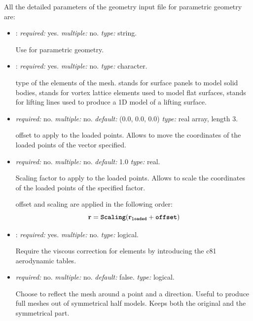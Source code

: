 All the detailed parameters of the geometry input file for parametric geometry are:
\begin{itemize}
  \item {}: \textit{required:} yes. \textit{multiple:} no. \textit{type:} string. 

  Use  for parametric geometry.

  \item {}: \textit{required:} yes. \textit{multiple:} no. \textit{type:} character.

  type of the elements of the mesh.  stands for surface panels to model solid bodies, 
   stands for vortex lattice elements used to model flat surfaces,  
  stands for lifting lines used to produce a 1D model of a lifting surface. 

  \item {} \textit{required:} no. \textit{multiple:} no. 
  \textit{default:} (0.0, 0.0, 0.0) \textit{type:} real array, length 3.

  offset to apply to the loaded points. Allows to move the coordinates of the loaded points of the vector specified. 

  \item {} \textit{required:} no. \textit{multiple:} no. 
  \textit{default:} 1.0 \textit{type:} real.

  Scaling factor to apply to the loaded points. Allows to scale the coordinates of the loaded points of the specified factor.

  offset and scaling are applied in the following order:
  \begin{equation*}
    \mathbf{r} = \textbf{\texttt{Scaling}} (\mathbf{r}_{\textbf{\texttt{loaded}}} + \textbf{\texttt{offset}})
  \end{equation*}


  \item {}: \textit{required:} yes. \textit{multiple:} no. \textit{type:} logical.

  Require the viscous correction for  elements by introducing the c81 aerodynamic tables. 

  \item {} \textit{required:} no. \textit{multiple:} no. 
  \textit{default:} false. \textit{type:} logical.

  Choose to reflect the mesh around a point and a direction. Useful to produce full meshes out of symmetrical half models. 
  Keeps both the original and the symmetrical part. 


\end{itemize}
